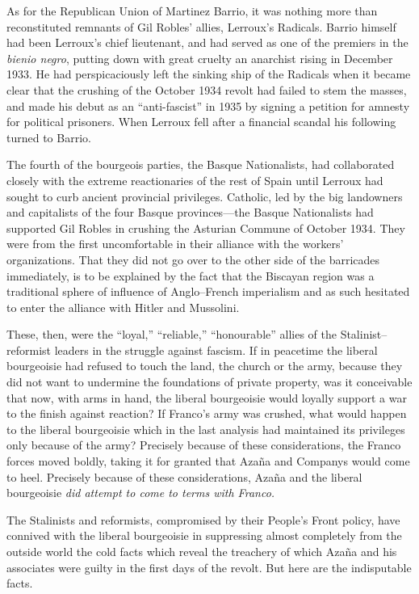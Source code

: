 As for the Republican Union of Martinez Barrio\indexDBarrio, it was nothing more than reconstituted remnants of Gil Robles’ allies, Lerroux’s Radicals. Barrio himself had been Lerroux’s chief lieutenant, and had served as one of the premiers in the \emph{bienio negro}, putting down with great cruelty an anarchist rising in December 1933. He had perspicaciously left the sinking ship of the Radicals when it became clear that the crushing of the October 1934 revolt had failed to stem the masses, and made his debut as an ``anti-fascist'' in 1935 by signing a petition for amnesty for political prisoners. When Lerroux{\indexALerroux} fell after a financial scandal his following turned to Barrio.

The fourth of the bourgeois parties, the Basque Nationalists, had collaborated closely with the extreme reactionaries of the rest of Spain until Lerroux had sought to curb ancient provincial privileges. Catholic, led by the big landowners and capitalists of the four Basque provinces---the Basque Nationalists had supported Gil Robles in crushing the Asturian Commune of October 1934. They were from the first uncomfortable in their alliance with the workers’ organizations. That they did not go over to the other side of the barricades immediately, is to be explained by the fact that the Biscayan region was a traditional sphere of influence of Anglo--French imperialism and as such hesitated to enter the alliance with Hitler and Mussolini.

These, then, were the ``loyal,'' ``reliable,'' ``honourable'' allies of the Stalinist--reformist leaders in the struggle against fascism. If in peacetime the liberal bourgeoisie had refused to touch the land, the church or the army, because they did not want to undermine the foundations of private property, was it conceivable that now, with arms in hand, the liberal bourgeoisie would loyally support a war to the finish against reaction? If Franco’s army was crushed, what would happen to the liberal bourgeoisie which in the last analysis had maintained its privileges only because of the army? Precisely because of these considerations, the Franco forces moved boldly, taking it for granted that Azaña and Companys would come to heel. Precisely because of these considerations, Azaña and the liberal bourgeoisie \emph{did attempt to come to terms with Franco.}

The Stalinists and reformists, compromised by their People’s Front policy, have connived with the liberal bourgeoisie in suppressing almost completely from the outside world the cold facts which reveal the treachery of which Azaña and his associates were guilty in the first days of the revolt. But here are the indisputable facts.
\nowidow

